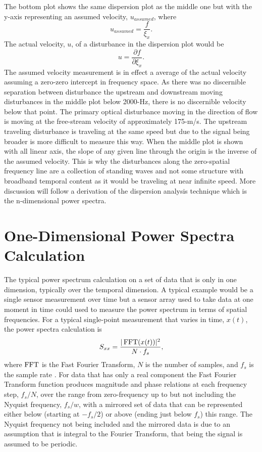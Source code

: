 The bottom plot shows the same dispersion plot as the middle one but with the y-axis representing an assumed velocity, $u_{assumed}$, where
\begin{equation}
  u_{assumed} = \frac{f}{\xi_x} \textrm{.}
  \label{eqn:04_velocity_assumed}
\end{equation}
The actual velocity, $u$, of a disturbance in the dispersion plot would be
\begin{equation}
  u = \frac{\partial f}{\partial \xi_x} \textrm{.}
  \label{eqn:04_velocity_actual}
\end{equation}
The assumed velocity measurement is in effect a average of the actual velocity assuming a zero-zero intercept in frequency space.
As there was no discernible separation between disturbance the upstream and downstream moving disturbances in the middle plot below 2000-Hz, there is no discernible velocity below that point.
The primary optical disturbance moving in the direction of flow is moving at the free-stream velocity of approximately 175-m/s.
The upstream traveling disturbance is traveling at the same speed but due to the signal being broader is more difficult to measure this way.
When the middle plot is shown with all linear axis, the slope of any given line through the origin is the inverse of the assumed velocity.
This is why the disturbances along the zero-spatial frequency line are a collection of standing waves and not some structure with broadband temporal content as it would be traveling at near infinite speed.
More discussion will follow a derivation of the dispersion analysis technique which is the n-dimensional power spectra.

\section{One-Dimensional Power Spectra Calculation}
The typical power spectrum calculation on a set of data that is only in one dimension, typically over the temporal dimension.
A typical example would be a single sensor measurement over time but a sensor array used to take data at one moment in time could used to measure the power spectrum in terms of spatial frequencies.
For a typical single-point measurement that varies in time, $x(t)$, the power spectra calculation is
\begin{equation}
 S_{xx} = \frac{|\operatorname{FFT}(x(t))|^2}{N\cdot f_{s}} \textrm{,}
 \label{eqn:04_basic_sxx}
\end{equation}
where $\operatorname{FFT}$ is the Fast Fourier Transform, $N$ is the number of samples, and $f_{s}$ is the sample rate \cite{Blackman-1958-4QtKgDb8}.
For data that has only a real component the Fast Fourier Transform function produces magnitude and phase relations at each frequency step, $f_{s}/N$, over the range from zero-frequency up to but not including the Nyquist frequency, $f_s/w$, with a mirrored set of data that can be represented either below (starting at $-f_s/2$) or above (ending just below $f_s$) this range.
The Nyquist frequency not being included and the mirrored data is due to an assumption that is integral to the Fourier Transform, that being the signal is assumed to be periodic.

